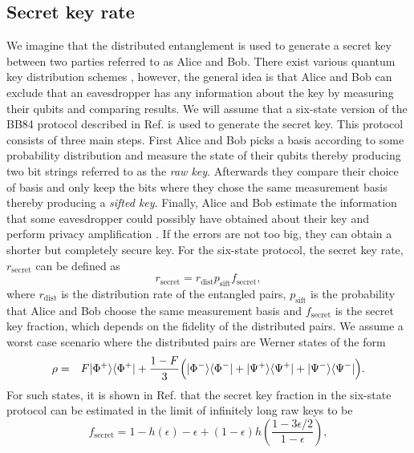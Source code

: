 \subsection{Secret key rate} \label{sec:secret}
We imagine that the distributed entanglement is used to generate a secret key
between two parties referred to as Alice and Bob. There exist various quantum
key distribution schemes \cite{scarani,bennett2,ekert,bruss}, however, the
general idea is that Alice and Bob can exclude that an eavesdropper has any
information about the key by measuring their qubits and comparing results. We
will assume that a six-state version of the BB84 protocol described in Ref.
\cite{bruss} is used to generate the secret key. This protocol consists of three
main steps. First Alice and Bob picks a basis according to some probability
distribution and measure the state of their qubits thereby producing two bit
strings referred to as the \emph{raw key}. Afterwards they compare their choice
of basis and only keep the bits where they chose the same measurement basis
thereby producing a \emph{sifted key}. Finally, Alice and Bob estimate the
information that some eavesdropper could possibly have obtained about their key
and perform privacy amplification \cite{scarani}. If the errors are not too big,
they can obtain a shorter but completely secure key.  For the six-state
protocol, the secret key rate, $r_{\mathrm{secret}}$ can be defined as
\begin{equation}
r_{\mathrm{secret}}=r_{\mathrm{dist}}p_{\mathrm{sift}}f_{\mathrm{secret}},
\end{equation}
where $r_{\mathrm{dist}}$ is the distribution rate of the entangled pairs,
$p_{\mathrm{sift}}$ is the probability that Alice and Bob choose the same
measurement basis and $f_{\mathrm{secret}}$ is the secret key fraction, which
depends on the fidelity of the distributed pairs. We assume a worst case
scenario where the distributed pairs are Werner states of the form
\begin{eqnarray}
\rho&=&F| \Phi^{+} \rangle\langle \Phi^{+} | +
\frac{1-F}{3}\Big(| \Phi^{-} \rangle\langle \Phi^{-} |
+| \Psi^{+} \rangle\langle \Psi^{+} |+| \Psi^{-} \rangle\langle \Psi^{-} |\Big).
\end{eqnarray}
For such states, it is shown in Ref. \cite{scarani} that the secret key fraction
in the six-state protocol can be estimated in the limit of infinitely long raw
keys to be
\begin{equation} \label{eq:secret2}
f_{\mathrm{secret}}=1-h(\epsilon)-\epsilon+(1-\epsilon)
h\left(\frac{1-3\epsilon/2}{1-\epsilon}\right),
\end{equation} 
